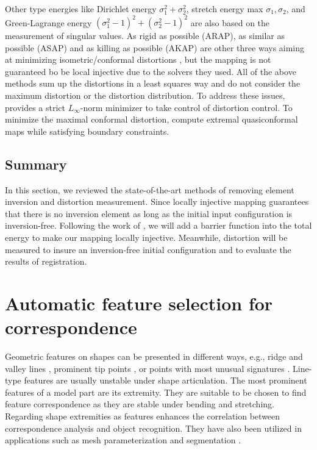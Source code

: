 Other type energies like Dirichlet energy $\sigma_1^2 + \sigma_2^2$, stretch energy max ${\sigma_1, \sigma_2}$, and Green-Lagrange energy $(\sigma_1^2 - 1)^2+(\sigma_2^2-1)^2$ are also based on the measurement of singular values. As rigid as possible (ARAP), as similar as possible (ASAP) and as killing as possible (AKAP) are other three ways aiming at minimizing isometric/conformal distortions \citep{alexa2000rigid,igarashi2005rigid,sorkine2007rigid,solomon2011killing}, but the mapping is not guaranteed bo be local injective due to the solvers \citep{liu2008local,solomon2011killing} they used. All of the above methods sum up the distortions in a least squares way and do not consider the maximum distortion or the distortion distribution. To address these issues, \cite{levi2014strict} provides a strict $L_\infty$-norm minimizer to take control of distortion control. To minimize the maximal conformal distortion, \cite{weber2012computing} compute extremal quasiconformal maps while satisfying boundary constraints.

\subsection{Summary}
In this section, we reviewed the state-of-the-art methods of removing element inversion and distortion measurement. Since locally injective mapping guarantees that there is no inversion element as long as the initial input configuration is inversion-free. Following the work of \citep{schuller2013locally,liu2016fast}, we will add a barrier function into the total energy to make our mapping locally injective. Meanwhile, distortion will be measured to insure an inversion-free initial configuration and to evaluate the results of registration.

\section{Automatic feature selection for correspondence}
Geometric features on shapes can be presented in different ways, e.g., ridge and valley lines \citep{ohtake2004ridge}, prominent tip points \citep{zhang2005feature}, or points with most unusual signatures \citep{gelfand2005robust}. Line-type features are usually unstable under shape articulation. The most prominent features of a model part are its extremity. They are suitable to be chosen to find feature correspondence as they are stable under bending and stretching. Regarding shape extremities as features enhances the correlation between correspondence analysis and object recognition. They have also been utilized in applications such as mesh parameterization \citep{zhang2005feature} and segmentation \citep{katz2005mesh}.

